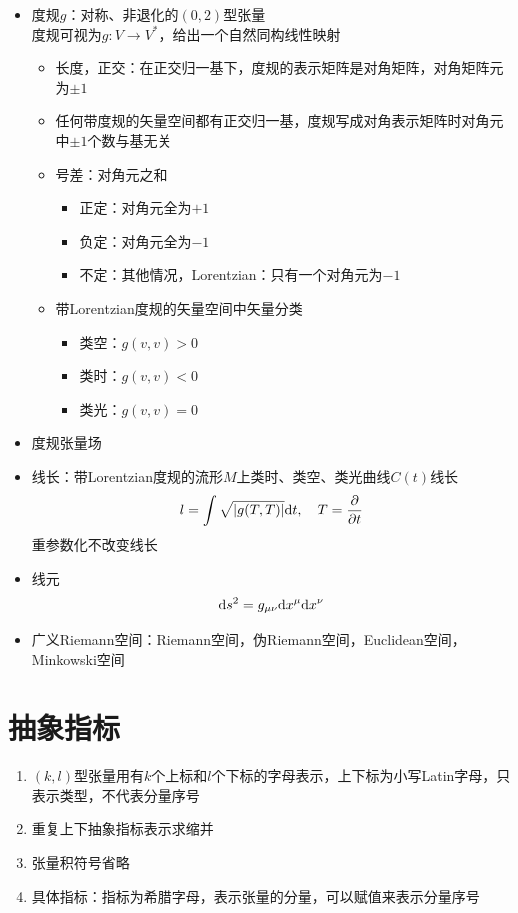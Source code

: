 \begin{itemize}
    \item 度规$g$：对称、非退化的$(0,2)$型张量\\
    度规可视为$g:V \to V^*$，给出一个自然同构线性映射
    \begin{itemize}
        \item 长度，正交：在正交归一基下，度规的表示矩阵是对角矩阵，对角矩阵元为$\pm 1$
        \item[\o] 任何带度规的矢量空间都有正交归一基，度规写成对角表示矩阵时对角元中$\pm 1$个数与基无关
        \item 号差：对角元之和
        \begin{itemize}
            \item 正定：对角元全为$+1$
            \item 负定：对角元全为$-1$
            \item 不定：其他情况，Lorentzian：只有一个对角元为$-1$
        \end{itemize}
        \item 带Lorentzian度规的矢量空间中矢量分类
        \begin{itemize}
            \item 类空：$g(v,v)>0$
            \item 类时：$g(v,v)<0$
            \item 类光：$g(v,v)=0$
        \end{itemize}
    \end{itemize}
    \item 度规张量场
    \item 线长：带Lorentzian度规的流形$M$上类时、类空、类光曲线$C(t)$线长
    \begin{gather*}
        l=\int \sqrt{|g(T,T)|} \mathrm{d} t,\quad T=\frac{\partial }{\partial t}
    \end{gather*}
    重参数化不改变线长
    \item 线元
    \begin{gather*}
        \mathrm{d} s^2=g_{\mu \nu} \mathrm{d} x^{\mu} \mathrm{d} x^{\nu}
    \end{gather*}
    \item 广义Riemann空间：Riemann空间，伪Riemann空间，Euclidean空间，Minkowski空间
\end{itemize}

\section{抽象指标}

\begin{enumerate}
    \item $(k,l)$型张量用有$k$个上标和$l$个下标的字母表示，上下标为小写Latin字母，只表示类型，不代表分量序号
    \item 重复上下抽象指标表示求缩并
    \item 张量积符号省略
    \item 具体指标：指标为希腊字母，表示张量的分量，可以赋值来表示分量序号
\end{enumerate}


